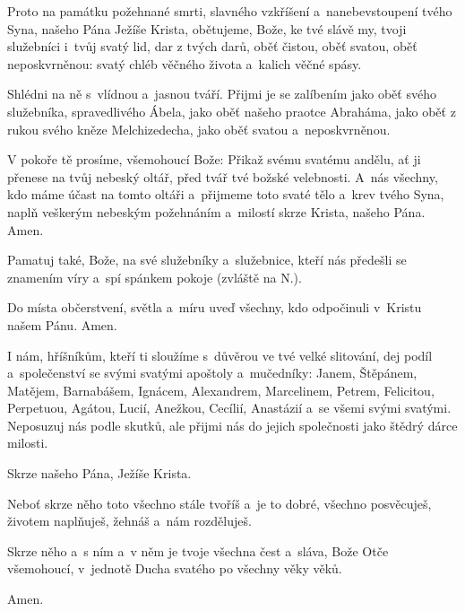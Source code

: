Proto na památku požehnané smrti, slavného vzkříšení a~nanebevstoupení tvého Syna, našeho Pána Ježíše Krista, obětujeme, Bože, ke tvé slávě my, tvoji služebníci i~tvůj svatý lid, dar z tvých darů, oběť čistou, oběť svatou, oběť neposkvrněnou: svatý chléb věčného života a~kalich věčné spásy.

Shlédni na ně s~vlídnou a~jasnou tváří. Přij\-mi je se zalíbením jako oběť svého služebníka, spravedlivého Ábela, jako oběť našeho praotce Abraháma, jako oběť z rukou svého kněze Melchizedecha, jako oběť svatou a~neposkvrněnou.

V pokoře tě prosíme, všemohoucí Bože: Přikaž svému svatému andělu, ať ji přenese na tvůj nebeský oltář, před tvář tvé božské velebnosti. A~nás všechny, kdo máme účast na tomto oltáři a~přijmeme toto svaté tělo a~krev tvého Syna, naplň veškerým nebeským požehnáním a~milostí skrze Krista, našeho Pána. Amen.

Pamatuj také, Bože, na své služebníky a~služebnice, kteří nás předešli se znamením víry a~spí spánkem pokoje (zvláště na {\color{red}N.}).

Do místa občerstvení, světla a~míru uveď všechny, kdo odpočinuli v~Kristu našem Pánu. Amen.

I nám, hříšníkům, kteří ti sloužíme s~důvěrou ve tvé velké slitování, dej podíl a~společenství se svými svatými apoštoly a~mučedníky: Janem, Štěpánem, Matějem, Bar\-nabášem, Ignácem, Alexandrem, Marcelinem, Petrem, Felicitou, Perpetuou, Agátou, Lucií, Anež\-kou, Cecílií, Anastázií a~se všemi svými svatými. Neposuzuj nás podle skutků, ale přijmi nás do jejich společnosti jako štědrý dárce milosti.

Skrze našeho Pána, Ježíše Krista.

Neboť skrze něho toto všechno stále tvoříš a~je to dobré, všechno posvěcuješ, životem naplňuješ, žehnáš a~nám rozděluješ.

Skrze něho a~s ním a~v něm je tvoje všechna čest a~sláva, Bože Otče všemohoucí, v~jednotě Ducha svatého po všechny věky věků.

\Rbardot{} Amen.

